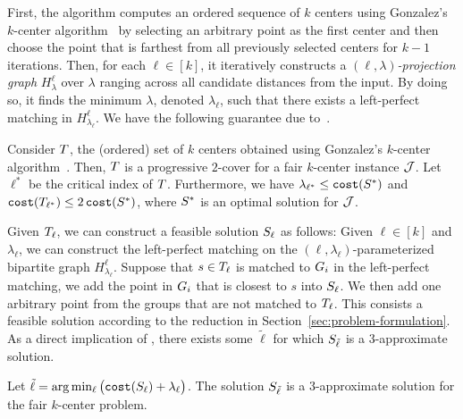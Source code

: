 \documentclass{article}
\begin{document}
First, the algorithm computes an ordered sequence \InitSolSet of $k$ centers using Gonzalez's $k$-center algorithm~\cite{gonzalez1985clustering}
by selecting an arbitrary point as the first center and then choose the point that is farthest from all previously selected centers for $k-1$ iterations.
Then, for each $\ell \in [k]$, it iteratively constructs a \emph{$(\ell, \lambda)$-projection graph} $H^{\ell}_{\lambda}$ over $\lambda$ ranging across all candidate distances from the input.
By doing so, it finds the minimum $\lambda$, denoted $\lambda_{\ell}$, such that there exists a left-perfect matching in $H^{\ell}_{\lambda_{\ell}}$.
We have the following guarantee due to~\citet{gadekar2025fair}.


\begin{theorem}
 \label{corollary:lambda-ell-star-lower-bound}
    Consider $T$, the (ordered) set of $k$ centers obtained using Gonzalez's $k$-center algorithm~\cite{gonzalez1985clustering}.
    Then, $T$ is a progressive $2$-cover for a fair $k$-center instance $\mathcal{J}$. 
    Let $\ell^*$ be the critical index of $T$.
    Furthermore, we have $\lambda_{\ell^*} \leq \texttt{cost}(S^*)$ and $\texttt{cost}(T_{\ell^*}) \leq 2\, \texttt{cost}(S^*)$, where $S^*$ is an optimal solution for $\mathcal{J}$. 
\end{theorem}



Given $T_{\ell}$, we can construct a feasible solution $S_{\ell}$ as follows:
Given $\ell \in [k]$ and $\lambda_{\ell}$, we can construct the left-perfect matching on the $(\ell, \lambda_{\ell})$-parameterized bipartite graph $H^{\ell}_{\lambda_{\ell}}$.
Suppose that $s \in T_{\ell}$ is matched to $G_i$ in the left-perfect matching, we add the point in $G_i$ that is closest to $s$ into $S_{\ell}$. 
We then add one arbitrary point from the groups that are not matched to $T_{\ell}$.
This consists a feasible solution 
according to the reduction in Section~\ref{sec:problem-formulation}.
As a direct implication of , there exists some $\tilde{\ell}$ for which $S_{\tilde{\ell}}$ is a $3$-approximate solution.

\begin{corollary}
    \label{corollary:conventional-lambda-ell-star-lower-bound}
    Let $\tilde{\ell} = \arg\min_{\ell} \big(\texttt{cost}(S_{\ell}) + \lambda_{\ell}\big)$.
    The solution $S_{\tilde{\ell}}$ is a $3$-approximate solution for the fair $k$-center problem.
\end{corollary}
\end{document}
